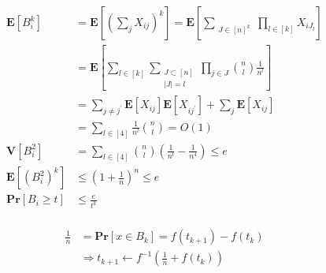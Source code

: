 \documentclass{article}
\newcommand{\prb}[1]{ \mathbf{Pr} \left[ {#1} \right]}
\newcommand{\expp}[1]{ \mathbf{E} \left[ {#1} \right]}
\newcommand{\xij} { X_{ij} }
\begin{document}
\begin{multicols*}{2}
  \begin{equation*}
    \begin{split}
      \expp{B_{i}^{k} } &= \expp{ \left( \sum_{j}{\xij } \right)^{k}  } =  \expp{ \sum_{ \substack { J \in [n]^k }  }{ \prod_{ l \in [k] } { X_{iJ_{l}} } }   } \\
      &=   \expp{ \sum_{l \in [k]}\sum_{ \substack { J \subset [n] \\ |J| = l }  }{ \prod_{j \in J} { \binom{n}{l} \frac{1  }{n^{l}} }   }} \\
      &=  \sum_{ j \neq j^{\prime} }{ \expp{X_{ij}}\expp{X_{ij^{\prime}}}   }  +
      \sum_{j}{ \expp{X_{ij}}}  \\
      &= \sum_{l \in [4] }\frac{1}{n^{l}} \binom{n}{l}  = O\left( 1 \right)  \\
      \mathbf{V}\left[ B_{i}^{2} \right] &= \sum_{ l \in [4]}{ \binom{n}{l} \left( \frac{1}{n^{l}} - \frac{1}{n^{4}} \right)  } \le e\\
      \expp{ \left( B_{i}^2 \right)^{k} } & \le \left( 1 + \frac{1}{n} \right)^{n} \le e \\ 
      \prb{ B_{i} \ge t} & \le \frac{e}{t^{k}}\\ 
    \end{split}
  \end{equation*}


  \begin{equation*}
    \begin{split}
      \frac{1}{n} &= \prb{ x \in B_{k} } = f\left( t_{k+1} \right)- f\left( t_{k} \right) \\
      & \Rightarrow t_{k+1} \leftarrow f^{-1}\left( \frac{1}{n} + f\left( t_{k} \right) \right) 
    \end{split}
  \end{equation*}



\end{multicols*}
\printbibliography 
\end{document}
